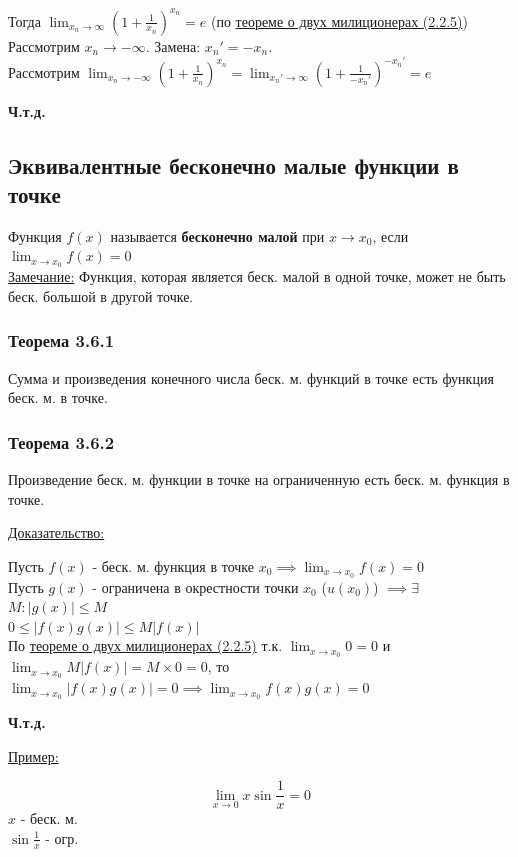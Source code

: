 \documentclass[12pt]{article}
\begin{document}
\begin{adjustwidth}{1.5em}{1.5em}
\begin{enumerate}
        \end{enumerate}
        Тогда $\lim_{x_n \to \infty}(1 + \frac{1}{x_n})^{x_n} = e$ (по \hyperref[th:2.2.5]{теореме о двух милиционерах (2.2.5)})\\
        Рассмотрим $x_n \to -\infty$. Замена: $x_n' = -x_n$.\\
        Рассмотрим $\lim_{x_n \to -\infty}(1+\frac{1}{x_n})^{x_n} = \lim_{x_n'\to\infty}(1 + \frac{1}{-x_n'})^{-x_n'} = e$\\
        \begin{center}
            \textbf{Ч.т.д.}
        \end{center}
    \end{adjustwidth}

    \subsection{Эквивалентные бесконечно малые функции в точке}
    \noindent Функция $f(x)$ называется \textbf{бесконечно малой} при $x \to x_0$, если $\lim_{x \to x_0}f(x) = 0$\\
    \underline{Замечание:} Функция, которая является беск. малой в одной точке, может не быть беск. большой в другой точке.
    \subsubsection*{Теорема 3.6.1}\label{th:3.6.1}
    Сумма и произведения конечного числа беск. м. функций в точке есть функция беск. м. в точке.
    \subsubsection*{Теорема 3.6.2}\label{th:3.6.2}
    Произведение беск. м. функции в точке на ограниченную есть беск. м. функция в точке.\par\noindent
    \underline{Доказательство:}
    \begin{adjustwidth}{1.5em}{1.5em}
        Пусть $f(x)$ - беск. м. функция в точке $x_0 \implies \lim_{x\to x_0}f(x)=0$\\
        Пусть $g(x)$ - ограничена в окрестности точки $x_0$ ($u(x_0)$) $\implies \exists$ $M : |g(x)| \le M$\\
        $0 \le |f(x)g(x)| \le M|f(x)|$\\
        По \hyperref[th:2.2.5]{теореме о двух милиционерах (2.2.5)} т.к. $\lim_{x\to x_0}0 = 0$ и $\lim_{x\to x_0}M|f(x)| = M \times 0 = 0$, то $\lim_{x\to x_0}|f(x)g(x)| = 0 \implies \lim_{x\to x_0}f(x)g(x) = 0$
        \begin{center}
            \textbf{Ч.т.д.}
        \end{center}
    \end{adjustwidth}
    \underline{Пример:}
    \begin{adjustwidth}{1.5em}{1.5em}
        \[\lim_{x\to0} x\sin \frac{1}{x} = 0\]
        $x$ - беск. м.\\
        $\sin \frac{1}{x}$ - огр.
    \end{adjustwidth}
\end{document}
